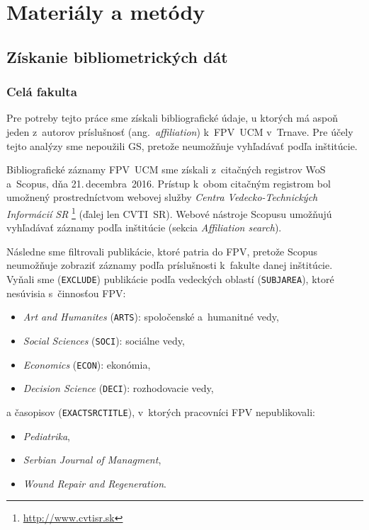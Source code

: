 \chapter{Materiály a metódy}
\label{chap:methods}

\section{Získanie bibliometrických dát}

\subsection{Celá fakulta}
\label{sec.all.mining}

Pre potreby tejto práce sme získali bibliografické údaje, u ktorých má aspoň
jeden z~autorov príslušnosť (ang.~\emph{affiliation}) k~FPV~UCM v~Trnave.  Pre
účely tejto analýzy sme nepoužili GS, pretože neumožňuje vyhľadávať podľa
inštitúcie.

Bibliografické záznamy FPV~UCM sme získali z~citačných registrov WoS a~Scopus,
dňa 21.\,decembra~2016.  Prístup k~obom citačným registrom bol umožnený
prostredníctvom webovej služby \emph{Centra Vedecko-Technických Informácií SR}%
\footnote{\url{http://www.cvtisr.sk}} (ďalej len CVTI~SR).  Webové nástroje
Scopusu umožňujú vyhľadávať záznamy podľa inštitúcie (sekcia \emph{Affiliation
  search}).

Následne sme filtrovali publikácie, ktoré patria do FPV, pretože Scopus
neumožňuje zobraziť záznamy podľa príslušnosti k~fakulte danej inštitúcie.
Vyňali sme (\texttt{EXCLUDE}) publikácie podľa vedeckých oblastí
(\texttt{SUBJAREA}), ktoré nesúvisia s~činnosťou FPV:

\begin{itemize}
\item \emph{Art and Humanites} (\texttt{ARTS}): spoločenské a~humanitné vedy,
\item \emph{Social Sciences} (\texttt{SOCI}): sociálne vedy,
\item \emph{Economics} (\texttt{ECON}): ekonómia,
\item \emph{Decision Science} (\texttt{DECI}): rozhodovacie vedy,
\end{itemize}
a časopisov (\texttt{EXACTSRCTITLE}), v~ktorých pracovníci FPV nepublikovali:

\begin{itemize}
\item \emph{Pediatrika},
\item \emph{Serbian Journal of Managment},
\item \emph{Wound Repair and Regeneration}.
\end{itemize}

